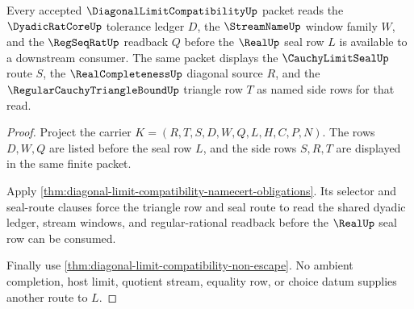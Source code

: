 \begin{theorem}
\label{thm:diagonal-limit-compatibility-root-dependency-triad}
Every accepted $\DiagonalLimitCompatibilityUp$ packet reads the
$\DyadicRatCoreUp$ tolerance ledger $D$, the $\StreamNameUp$ window family
$W$, and the $\RegSeqRatUp$ readback $Q$ before the $\RealUp$ seal row $L$ is
available to a downstream consumer. The same packet displays the
$\CauchyLimitSealUp$ route $S$, the $\RealCompletenessUp$ diagonal source
$R$, and the $\RegularCauchyTriangleBoundUp$ triangle row $T$ as named side
rows for that read.
\end{theorem}
\begin{proof}
Project the carrier $K=(R,T,S,D,W,Q,L,H,C,P,N)$. The rows $D,W,Q$ are listed
before the seal row $L$, and the side rows $S,R,T$ are displayed in the same
finite packet.

Apply \autoref{thm:diagonal-limit-compatibility-namecert-obligations}. Its
selector and seal-route clauses force the triangle row and seal route to read
the shared dyadic ledger, stream windows, and regular-rational readback before
the $\RealUp$ seal row can be consumed.

Finally use \autoref{thm:diagonal-limit-compatibility-non-escape}. No ambient
completion, host limit, quotient stream, equality row, or choice datum supplies
another route to $L$.
\end{proof}

